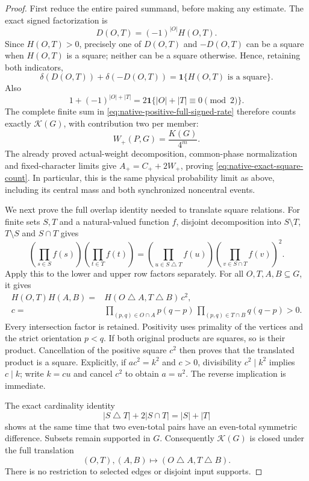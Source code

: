 \documentclass[11pt]{article}
\begin{document}
\begin{proof}
First reduce the entire paired summand, before making any estimate.
The exact signed factorization is
\[
                    D(O,T)=(-1)^{|O|}H(O,T).
\]
Since \(H(O,T)>0\), precisely one of \(D(O,T)\) and \(-D(O,T)\)
can be a square when \(H(O,T)\) is a square; neither can be a square
otherwise. Hence, retaining both indicators,
\[
       \delta(D(O,T))+\delta(-D(O,T))
                  =\mathbf1\{H(O,T)\text{ is a square}\}.
\]
Also
\[
       1+(-1)^{|O|+|T|}
             =2\mathbf1\{|O|+|T|\equiv0\pmod2\}.
\]
The complete finite sum in
\eqref{eq:native-positive-full-signed-rate} therefore counts exactly
\(\mathcal K(G)\), with contribution two per member:
\[
                       W_+(P,G)=\frac{K(G)}{4^m}.
\]
The already proved actual-weight decomposition, common-phase
normalization and fixed-character limits give
\(A_+=C_++2W_+\), proving \eqref{eq:native-exact-square-count}.
In particular, this is the same physical probability limit as above,
including its central mass and both synchronized noncentral events.

We next prove the full overlap identity needed to translate square
relations. For finite sets \(S,T\) and a natural-valued function \(f\),
disjoint decomposition into \(S\setminus T\), \(T\setminus S\) and
\(S\cap T\) gives
\[
 \left(\prod_{s\in S}f(s)\right)
 \left(\prod_{t\in T}f(t)\right)
   =\left(\prod_{u\in S\mathbin{\triangle}T}f(u)\right)
       \left(\prod_{v\in S\cap T}f(v)\right)^2.
\]
Apply this to the lower and upper row factors separately. For all
\(O,T,A,B\subseteq G\), it gives
\begin{align*}
 H(O,T)H(A,B)
  ={}&H(O\mathbin{\triangle}A,T\mathbin{\triangle}B)\,c^2,\\
 c={}&
 \prod_{(p,q)\in O\cap A}p(q-p)\,
 \prod_{(p,q)\in T\cap B}q(q-p)>0.
\end{align*}
Every intersection factor is retained. Positivity uses primality of
the vertices and the strict orientation \(p<q\).
If both original products are squares, so is their product.
Cancellation of the positive square \(c^2\) then proves that the
translated product is a square. Explicitly, if \(ac^2=k^2\) and
\(c>0\), divisibility \(c^2\mid k^2\) implies \(c\mid k\);
write \(k=cu\) and cancel \(c^2\) to obtain \(a=u^2\).
The reverse implication is immediate.

The exact cardinality identity
\[
 |S\mathbin{\triangle}T|+2|S\cap T|=|S|+|T|
\]
shows at the same time that two even-total pairs have an even-total
symmetric difference. Subsets remain supported in \(G\).
Consequently \(\mathcal K(G)\) is closed under the full translation
\[
                (O,T),(A,B)\longmapsto
                 (O\mathbin{\triangle}A,T\mathbin{\triangle}B).
\]
There is no restriction to selected edges or disjoint input supports.


\end{proof}
\end{document}
